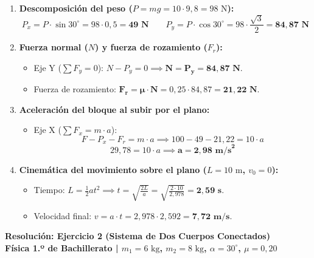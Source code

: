 ﻿\documentclass[11pt,a4paper]{article}
\begin{document}
\vspace{-0.1cm}
\begin{enumerate}[label=\textbf{\alph*)}, leftmargin=2em, itemsep=6pt]
    \item \textbf{Descomposición del peso ($P = mg = 10 \cdot 9{,}8 = 98\text{ N}$):}
    \[
    P_x = P \cdot \sin 30^\circ = 98 \cdot 0{,}5 = \mathbf{49\text{ N}} \qquad P_y = P \cdot \cos 30^\circ = 98 \cdot \frac{\sqrt{3}}{2} = \mathbf{84{,}87\text{ N}}
    \]

    \item \textbf{Fuerza normal ($N$) y fuerza de rozamiento ($F_r$):}
    \begin{itemize}[leftmargin=1.5em, itemsep=2pt]
        \item Eje Y ($\sum F_y = 0$): $N - P_y = 0 \implies \mathbf{N = P_y = 84{,}87\text{ N}}$.
        \item Fuerza de rozamiento: $\mathbf{F_r = \mu \cdot N} = 0{,}25 \cdot 84{,}87 = \mathbf{21{,}22\text{ N}}$.
    \end{itemize}

    \item \textbf{Aceleración del bloque al subir por el plano:}
    \begin{itemize}[leftmargin=1.5em, itemsep=2pt]
        \item Eje X ($\sum F_x = m \cdot a$):
        \[
        F - P_x - F_r = m \cdot a \implies 100 - 49 - 21{,}22 = 10 \cdot a
        \]
        \[
        29{,}78 = 10 \cdot a \implies \mathbf{a = 2{,}98\text{ m/s}^2}
        \]
    \end{itemize}

    \item \textbf{Cinemática del movimiento sobre el plano ($L = 10\text{ m}$, $v_0 = 0$):}
    \begin{itemize}[leftmargin=1.5em, itemsep=2pt]
        \item Tiempo: $L = \frac{1}{2}at^2 \implies t = \sqrt{\frac{2L}{a}} = \sqrt{\frac{2 \cdot 10}{2{,}978}} = \mathbf{2{,}59\text{ s}}$.
        \item Velocidad final: $v = a \cdot t = 2{,}978 \cdot 2{,}592 = \mathbf{7{,}72\text{ m/s}}$.
    \end{itemize}
\end{enumerate}

\newpage

\begin{center}
    {\LARGE \textbf{Resolución: Ejercicio 2 (Sistema de Dos Cuerpos Conectados)}}\\[4pt]
    {\large \textbf{Física 1.º de Bachillerato | $m_1 = 6\text{ kg}$, $m_2 = 8\text{ kg}$, $\alpha = 30^\circ$, $\mu = 0{,}20$}}
\end{center}
\end{document}
